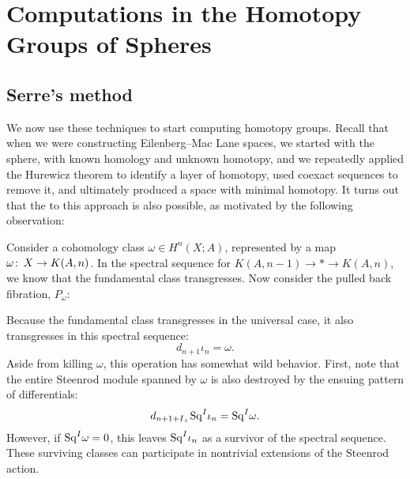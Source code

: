 
\chapter{Computations in the Homotopy Groups of Spheres}





\section{Serre's method}\label{SerresMethod}

We now use these techniques to start computing homotopy groups.
Recall that when we were constructing Eilenberg--Mac Lane spaces, we started with the sphere, with known homology and unknown homotopy, and we repeatedly applied the Hurewicz theorem to identify a layer of homotopy, used coexact sequences to remove it, and ultimately produced a space with minimal homotopy.
It turns out that the  to this approach is also possible, as motivated by the following observation:

\begin{remark}\label{KillingCohWithExact}
Consider a cohomology class $\omega \in H^n(X; A)$, represented by a map $\omega\colon\thinspace X \to K(A, n)$.
In the spectral sequence for $K(A, n-1) \to * \to K(A, n)$, we know that the fundamental class transgresses.
Now consider the pulled back fibration, $P_\omega$:
\begin{center}
\end{center}
Because the fundamental class transgresses in the universal case, it also transgresses in this spectral sequence: \[d_{n+1} \iota_n = \omega.\]
Aside from killing $\omega$, this operation has somewhat wild behavior.
First, note that the entire Steenrod module spanned by $\omega$ is also destroyed by the ensuing pattern of differentials: \[d_{n+1+I_+} \mathrm{Sq}^I \iota_n = \mathrm{Sq}^I \omega.\]
However, if $\mathrm{Sq}^I \omega = 0$, this leaves $\mathrm{Sq}^I \iota_n$ as a survivor of the spectral sequence.
These surviving classes can participate in nontrivial extensions of the Steenrod action.
\end{remark}

